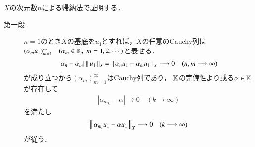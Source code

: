 	\begin{prf}\mbox{}
		$X$の次元数$n$による帰納法で証明する．
		\begin{description}
			\item[第一段]
				$n=1$のとき$X$の基底を$u_1$とすれば，$X$の任意のCauchy列は
				$( \alpha_m u_1)_{m=1}^{\infty} \quad (\alpha_m \in \mathbb{K},\ m=1,2,\cdots)$と表せる．
				\begin{align}
					\left| \alpha_n - \alpha_m \right| \left\|\, u_1\, \right\|_{X}
					= \left\|\, \alpha_n u_1 - \alpha_m u_1\, \right\|_{X}
					\longrightarrow 0 \quad (n,m \longrightarrow \infty)
				\end{align}
				が成り立つから$\left( \alpha_m \right)_{m=1}^{\infty}$はCauchy列であり，
				$\mathbb{K}$の完備性より或る$\alpha \in \mathbb{K}$が存在して
				\begin{align}
					\left| \alpha_{m_k} - \alpha \right| \longrightarrow 0 \quad (k \longrightarrow \infty)
				\end{align}
				を満たし
				\begin{align}
					\left\|\, \alpha_{m_k} u_1 - \alpha u_1\, \right\|_{X} \longrightarrow 0 \quad (k \longrightarrow \infty)
				\end{align}
				が従う．
			

\end{description}
\end{prf}
